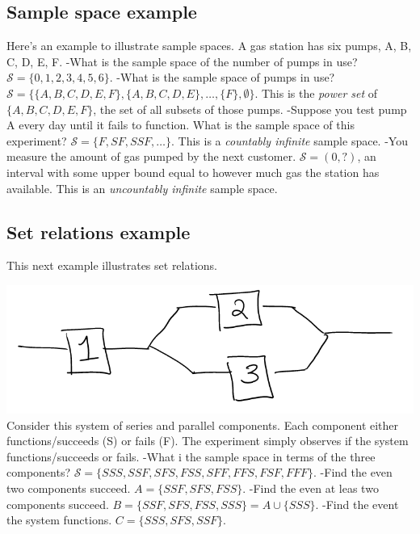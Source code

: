 \documentclass[
]{book}
\theoremstyle{definition}
\theoremstyle{definition}
\theoremstyle{definition}
\theoremstyle{definition}
\theoremstyle{remark}
\begin{document}
\hypertarget{sample-space-example}{%
\subsection{Sample space example}\label{sample-space-example}}

Here's an example to illustrate sample spaces. A gas station has six pumps, A, B, C, D, E, F.
-What is the sample space of the number of pumps in use? \(\mathcal{S} =\{0,1,2,3,4,5,6\}\).
-What is the sample space of pumps in use? \(\mathcal{S} = \{\{A,B,C,D,E,F\},\{A,B,C,D,E\}, \ldots,\{F\}, \emptyset \}\). This is the \emph{power set} of \(\{A,B,C,D,E,F\}\), the set of all subsets of those pumps.
-Suppose you test pump A every day until it fails to function. What is the sample space of this experiment? \(\mathcal{S} = \{F, SF, SSF, \ldots \}\). This is a \emph{countably infinite} sample space.
-You measure the amount of gas pumped by the next customer. \(\mathcal{S} = (0, ?)\), an interval with some upper bound equal to however much gas the station has available. This is an \emph{uncountably infinite} sample space.

\hypertarget{set-relations-example}{%
\subsection{Set relations example}\label{set-relations-example}}

This next example illustrates set relations.

\includegraphics[width=11in]{system}
Consider this system of series and parallel components. Each component either functions/succeeds (S) or fails (F). The experiment simply observes if the system functions/succeeds or fails.
-What i the sample space in terms of the three components? \(\mathcal{S} = \{SSS, SSF, SFS, FSS, SFF, FFS, FSF, FFF\}\).
-Find the even two components succeed. \(A = \{SSF, SFS, FSS\}\).
-Find the even at leas two components succeed. \(B = \{SSF, SFS, FSS, SSS\} = A\cup \{SSS\}\).
-Find the event the system functions. \(C = \{SSS, SFS, SSF\}\).
\end{document}
